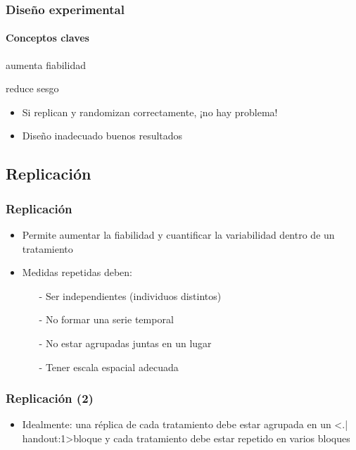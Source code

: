 \documentclass[gray,handout,mathserif]{beamer}
\begin{document}
\begin{frame}[label=expdes1]
   \frametitle{Diseño experimental}
   \framesubtitle{Conceptos claves}
   \begin{description}[<+-| handout:1>]
      \item[Replicaci\'on:] aumenta fiabilidad
      \item[Aleatorizaci\'on:] reduce sesgo
   \end{description}
   \medskip
   \begin{itemize}[<+-| handout:1>]
      \item Si replican y randomizan correctamente, ¡no hay problema! \\
      \item Diseño inadecuado \raisebox{-0.8ex}{} buenos resultados
   \end{itemize}
\end{frame}%


\subsection[Replicaci\'on]{Replicaci\'on}

\begin{frame}[label=replic1]
\frametitle{Replicaci\'on}
   \begin{itemize}[<+-| handout:1>]
      \item Permite aumentar la fiabilidad y cuantificar la variabilidad dentro de un tratamiento
      \medskip
      \item Medidas repetidas deben:
         \begin{itemize}[<+- | alert@+| handout:1>]
            \item[-] Ser independientes (individuos distintos)
            \item[-] No formar una serie temporal 
            \item[-] No estar agrupadas juntas en un lugar
            \item[-] Tener escala espacial adecuada
         \end{itemize}
   \end{itemize}
\end{frame}%


\begin{frame}[label=replic2]
   \frametitle{Replicaci\'on (2)}
   \begin{itemize}[<+-| handout:1>]
      \item Idealmente: una r\'eplica de cada tratamiento debe estar agrupada en un \structure<.| handout:1>{bloque} y cada tratamiento debe estar repetido en varios bloques 
   \end{itemize}
\end{frame}%
\end{document}
